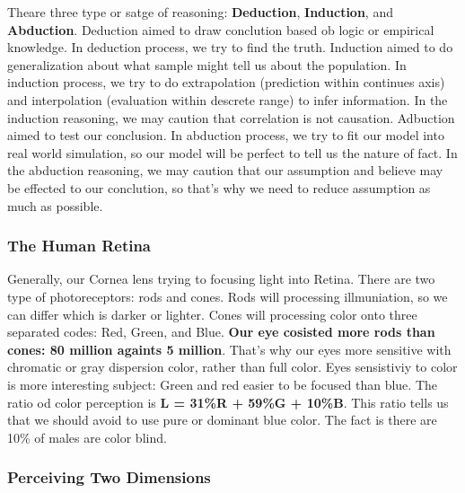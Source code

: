 \documentclass[11pt]{article}
\begin{document}
Theare three type or satge of reasoning: \textbf{Deduction},
\textbf{Induction}, and \textbf{Abduction}. Deduction aimed to draw
conclution based ob logic or empirical knowledge. In deduction process,
we try to find the truth. Induction aimed to do generalization about
what sample might tell us about the population. In induction process, we
try to do extrapolation (prediction within continues axis) and
interpolation (evaluation within descrete range) to infer information.
In the induction reasoning, we may caution that correlation is not
causation. Adbuction aimed to test our conclusion. In abduction process,
we try to fit our model into real world simulation, so our model will be
perfect to tell us the nature of fact. In the abduction reasoning, we
may caution that our assumption and believe may be effected to our
conclution, so that's why we need to reduce assumption as much as
possible.

    \subsubsection{The Human Retina}\label{the-human-retina}

Generally, our Cornea lens trying to focusing light into Retina. There
are two type of photoreceptors: rods and cones. Rods will processing
illmuniation, so we can differ which is darker or lighter. Cones will
processing color onto three separated codes: Red, Green, and Blue.
\textbf{Our eye cosisted more rods than cones: 80 million againts 5
million}. That's why our eyes more sensitive with chromatic or gray
dispersion color, rather than full color. Eyes sensistiviy to color is
more interesting subject: Green and red easier to be focused than blue.
The ratio od color perception is \textbf{L = 31\%R + 59\%G + 10\%B}.
This ratio tells us that we should avoid to use pure or dominant blue
color. The fact is there are 10\% of males are color blind.

    \subsubsection{Perceiving Two
Dimensions}\label{perceiving-two-dimensions}
\end{document}
